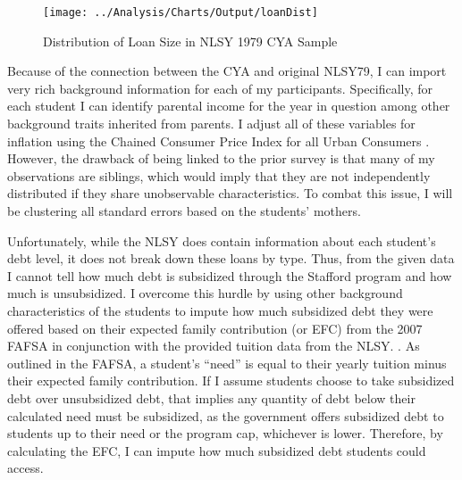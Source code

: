 \documentclass[12pt]{article}
\begin{document}
	\begin{figure}
		\centering
		\caption{Distribution of Loan Size in NLSY 1979 CYA Sample}
		\label{loanDist}
		\texttt{[image: ../Analysis/Charts/Output/loanDist]}
	\end{figure}

	
	Because of the connection between the CYA and original NLSY79, I can import very rich background information for each of my participants. Specifically, for each student I can identify parental income for the year in question among other background traits inherited from parents. I adjust all of these variables for inflation using the Chained Consumer Price Index for all Urban Consumers \parencite{bls2019}. However, the drawback of being linked to the prior survey is that many of my observations are siblings, which would imply that they are not independently distributed if they share unobservable characteristics. To combat this issue, I will be clustering all standard errors based on the students' mothers. 
	
	Unfortunately, while the NLSY does contain information about each student's debt level, it does not break down these loans by type. Thus, from the given data I cannot tell how much debt is subsidized through the Stafford program and how much is unsubsidized. I overcome this hurdle by using other background characteristics of the students to impute how much subsidized debt they were offered based on their expected family contribution (or EFC) from the 2007 FAFSA in conjunction with the provided tuition data from the NLSY. \parencite{doe2007}. As outlined in the FAFSA, a student's ``need'' is equal to their yearly tuition minus their expected family contribution. If I assume students choose to take subsidized debt over unsubsidized debt, that implies any quantity of debt below their calculated need must be subsidized, as the government offers subsidized debt to students up to their need or the program cap, whichever is lower. Therefore, by calculating the EFC, I can impute how much subsidized debt students could access.
	
\end{document}
